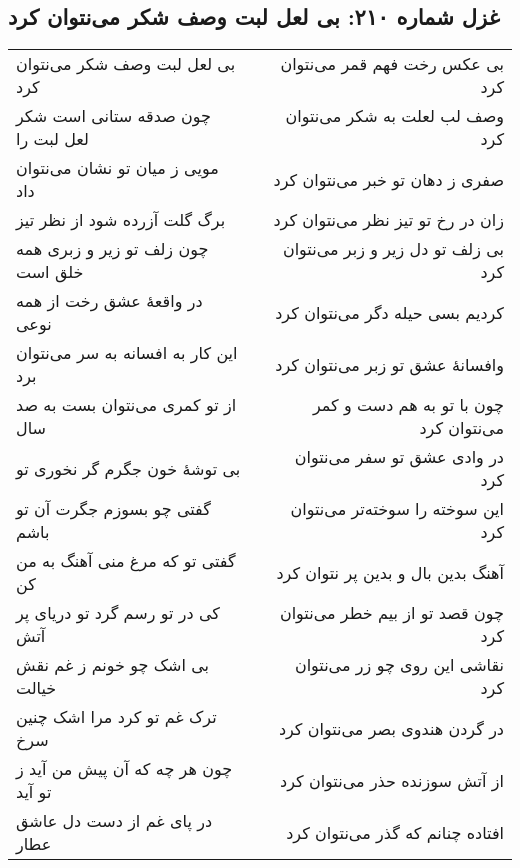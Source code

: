 \begin{center}
\section*{غزل شماره ۲۱۰: بی لعل لبت وصف شکر می‌نتوان کرد}
\label{sec:210}
\begin{longtable}{l p{0.5cm} r}
بی لعل لبت وصف شکر می‌نتوان کرد
&&
بی عکس رخت فهم قمر می‌نتوان کرد
\\
چون صدقه ستانی است شکر لعل لبت را
&&
وصف لب لعلت به شکر می‌نتوان کرد
\\
مویی ز میان تو نشان می‌نتوان داد
&&
صفری ز دهان تو خبر می‌نتوان کرد
\\
برگ گلت آزرده شود از نظر تیز
&&
زان در رخ تو تیز نظر می‌نتوان کرد
\\
چون زلف تو زیر و زبری همه خلق است
&&
بی زلف تو دل زیر و زبر می‌نتوان کرد
\\
در واقعهٔ عشق رخت از همه نوعی
&&
کردیم بسی حیله دگر می‌نتوان کرد
\\
این کار به افسانه به سر می‌نتوان برد
&&
وافسانهٔ عشق تو زبر می‌نتوان کرد
\\
از تو کمری می‌نتوان بست به صد سال
&&
چون با تو به هم دست و کمر می‌نتوان کرد
\\
بی توشهٔ خون جگرم گر نخوری تو
&&
در وادی عشق تو سفر می‌نتوان کرد
\\
گفتی چو بسوزم جگرت آن تو باشم
&&
این سوخته را سوخته‌تر می‌نتوان کرد
\\
گفتی تو که مرغ منی آهنگ به من کن
&&
آهنگ بدین بال و بدین پر نتوان کرد
\\
کی در تو رسم گرد تو دریای پر آتش
&&
چون قصد تو از بیم خطر می‌نتوان کرد
\\
بی اشک چو خونم ز غم نقش خیالت
&&
نقاشی این روی چو زر می‌نتوان کرد
\\
ترک غم تو کرد مرا اشک چنین سرخ
&&
در گردن هندوی بصر می‌نتوان کرد
\\
چون هر چه که آن پیش من آید ز تو آید
&&
از آتش سوزنده حذر می‌نتوان کرد
\\
در پای غم از دست دل عاشق عطار
&&
افتاده چنانم که گذر می‌نتوان کرد
\\
\end{longtable}
\end{center}
